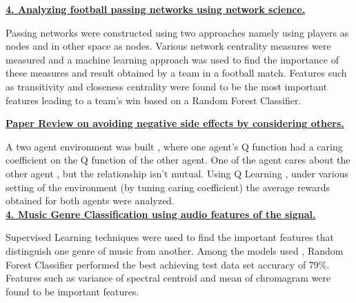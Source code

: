 \href{https://github.com/Dinesh-Adhithya-H/Analyzing-Football-Passing-Networks/blob/main/Report/Network%20Science%20Assignment%203.pdf}{{\bf 4. Analyzing football passing networks using network science.}}
\item Passing networks were constructed using two approaches namely using players as nodes and in other space as nodes. Various network centrality measures were measured and a machine learning approach was used to find the importance of these measures and result obtained by a team in a football match. Features such as transitivity and closeness centrality were found to be the most important features leading to a team's win based on a Random Forest Classifier.


\href{https://github.com/Dinesh-Adhithya-H/Reinforcement-Learning/blob/main/avoiding-negative-side-effects-considering-others/Avoiding%20Negative%20Side%20Effects%20by%20Considering%20Others%20(1).pdf}{\bf{ Paper Review on avoiding negative side effects by considering others.}}
\item A two agent environment was built , where one agent's Q function had a caring coefficient on the Q function of the other agent. One of the agent cares about the other agent , but the relationship isn't mutual. Using Q Learning , under various setting of the environment (by tuning caring coefficient) the average rewards obtained for both agents were analyzed.\\

\href{https://github.com/Dinesh-Adhithya-H/Data_Science_and_Machine_Learning/blob/main/MusicGenreClassification/DSML_Final_Project_Report%20Dinesh_Rohit.pdf}{{\bf 4. Music Genre Classification using audio features of the signal.}}
\item Supervised Learning techniques were used to find the important features that distinguish one genre of music from another. Among the models used , Random Forest Classifier performed the best achieving test data set accuracy of 79\%. Features such as variance of spectral centroid and mean of chromagram were found to be important features.
